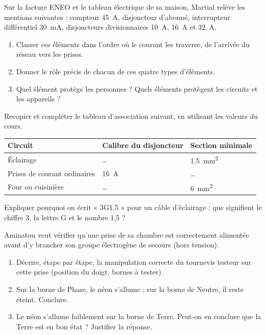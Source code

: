 \documentclass[11pt]{article}
\newcounter{popsec}
\newcounter{popsub}
\newcommand{\courssub}[1]{%
  \stepcounter{popsub}%
  \par\vspace{9pt}\noindent{\popxbold\fontsize{11.5}{13}\selectfont\color{popink}{\color{poporange}\thepopsec.\thepopsub}\hspace{6pt}#1}\par\nopagebreak\vspace{4pt}
}
\begin{document}
\courssub{Je m'entraîne}

\begin{exercice}
Sur la facture ENEO et le tableau électrique de sa maison, Martial relève les mentions suivantes : compteur \SI{45}{A}, disjoncteur d'abonné, interrupteur différentiel \SI{30}{mA}, disjoncteurs divisionnaires \SI{10}{A}, \SI{16}{A} et \SI{32}{A}.
\begin{enumerate}
\item Classer ces éléments dans l'ordre où le courant les traverse, de l'arrivée du réseau vers les prises.
\item Donner le rôle précis de chacun de ces quatre types d'éléments.
\item Quel élément protège les personnes ? Quels éléments protègent les circuits et les appareils ?
\end{enumerate}
\end{exercice}

\begin{exercice}
Recopier et compléter le tableau d'association suivant, en utilisant les valeurs du cours.
\begin{center}
\begin{tabularx}{\linewidth}{|X|l|l|}
\hline
\rowcolor{popblueL} \textbf{Circuit} & \textbf{Calibre du disjoncteur} & \textbf{Section minimale} \\
\hline
Éclairage & \ldots & \SI{1,5}{mm^2} \\
\hline
Prises de courant ordinaires & \SI{16}{A} & \ldots \\
\hline
Four ou cuisinière & \ldots & \SI{6}{mm^2} \\
\hline
\end{tabularx}
\end{center}
Expliquer pourquoi on écrit « 3G1,5 » pour un câble d'éclairage : que signifient le chiffre 3, la lettre G et le nombre 1,5 ?
\end{exercice}

\begin{exercice}
Aminatou veut vérifier qu'une prise de sa chambre est correctement alimentée avant d'y brancher son groupe électrogène de secours (hors tension).
\begin{enumerate}
\item Décrire, étape par étape, la manipulation correcte du tournevis testeur sur cette prise (position du doigt, bornes à tester).
\item Sur la borne de Phase, le néon s'allume ; sur la borne de Neutre, il reste éteint. Conclure.
\item Le néon s'allume faiblement sur la borne de Terre. Peut-on en conclure que la Terre est en bon état ? Justifier la réponse.
\end{enumerate}
\end{exercice}
\end{document}
